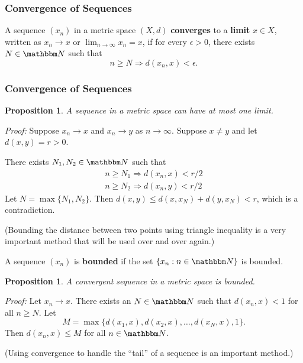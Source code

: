 \documentclass[9pt,aspectratio=169]{beamer}
\newcommand{\NN}{\mathbbm N}
\renewcommand{\implies}{\Rightarrow}
\newtheorem{proposition}[theorem]{Proposition}
\begin{document}
\begin{frame}
    \frametitle{Convergence of Sequences}
    \begin{definition}
        A sequence $(x_n)$ in a metric space $(X, d)$ \textbf{converges} to a
        \textbf{limit} $x\in X$, written as $x_n \to x$ or $\lim_{n\to\infty}
        x_n = x$, if for every $\epsilon > 0$, there exists $N \in \NN$ such
        that
        \begin{equation*}
            n \geq N \implies d(x_n, x) < \epsilon.
        \end{equation*}
    \end{definition}
\end{frame}

\begin{frame}[allowframebreaks]
    \frametitle{Convergence of Sequences}
    \begin{proposition}
        A sequence in a metric space can have at most one limit.
    \end{proposition}
    \emph{Proof:} Suppose $x_n \to x$ and $x_n \to y$ as $n \to \infty$.
    Suppose $x \neq y$ and let $d(x, y) = r > 0$.

    There exists $N_1, N_2 \in \NN$ such that
    \begin{gather*}
        n \geq N_1 \implies d(x_n, x) < r/2\\
        n \geq N_2 \implies d(x_n, y) < r/2
    \end{gather*}
    Let $N = \max\{N_1, N_2\}$. Then $d(x, y) \leq d(x, x_N) + d(y, x_N) <
    r$, which is a contradiction.

    (Bounding the distance between two points using triangle inequality is a
    very important method that will be used over and over again.)

    \framebreak
    \begin{definition}
        A sequence $(x_n)$ is \textbf{bounded} if the set $\{x_n: n\in\NN\}$
        is bounded.
    \end{definition}
    \begin{proposition}
        A convergent sequence in a metric space is bounded.
    \end{proposition}
    \emph{Proof:} Let $x_n \to x$. There exists an $N \in \NN$ such that
    $d(x_n, x) < 1$ for all $n \geq N$. Let
    \begin{equation*}
        M = \max\{d(x_1, x), d(x_2, x), \ldots, d(x_N, x), 1\}.
    \end{equation*}
    Then $d(x_n, x) \leq M$ for all $n \in \NN$.

    (Using convergence to handle the ``tail'' of a sequence is an important
    method.)
\end{frame}
\end{document}
